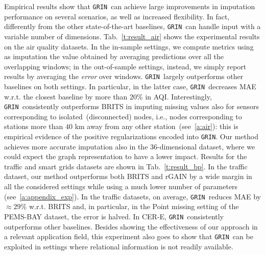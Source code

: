 \documentclass{article} \usepackage{iclr2022_conference,times}
\newcommand{\GRIL}{\texttt{GRIN}}
\begin{document}
Empirical results show that \GRIL\ can achieve large improvements in imputation performance on several scenarios, as well as increased flexibility. In fact, differently from the other state-of-the-art baselines, \GRIL\ can handle input with a variable number of dimensions.
Tab.~\ref{t:result_air} shows the experimental results on the air quality datasets. In the in-sample settings, we compute metrics using as imputation the value obtained by averaging predictions over all the overlapping windows; in the out-of-sample settings, instead, we simply report results by averaging the \emph{error} over windows. \GRIL\ largely outperforms other baselines on both settings. In particular, in the latter case, \GRIL\ decreases MAE w.r.t. the closest baseline by more than $20\%$ in AQI. Interestingly, \GRIL\ consistently outperforms BRITS in imputing missing values also for sensors corresponding to isolated~(disconnected) nodes, i.e., nodes corresponding to stations more than $40$ km away from any other station~(see~\ref{a:air}): this is empirical evidence of the positive regularizations encoded into \GRIL. Our method achieves more accurate imputation also in the $36$-dimensional dataset, where we could expect the graph representation to have a lower impact. 
Results for the traffic and smart grids datasets are shown in Tab.~\ref{t:result_bp}. In the traffic dataset, our method outperforms both BRITS and rGAIN by a wide margin in all the considered settings while using a much lower number of parameters (see~\ref{a:appendix_exp}). In the traffic datasets, on average, \GRIL\ reduces MAE by $\approx 29\%$ w.r.t. BRITS and, in particular, in the Point missing setting of the PEMS-BAY dataset, the error is halved. In CER-E, \GRIL\ consistently outperforms other baselines. Besides showing the effectiveness of our approach in a relevant application field, this experiment also goes to show that \GRIL\ can be exploited in settings where relational information is not readily available. 
\end{document}
